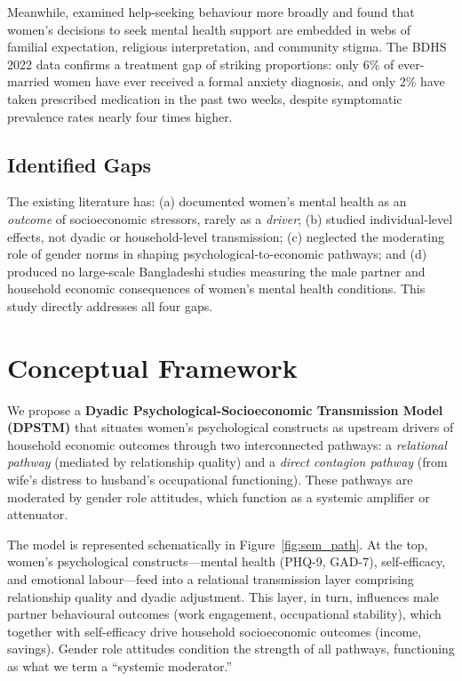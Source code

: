 \documentclass[12pt, a4paper]{article}
\begin{document}
Meanwhile, \citet{rahman2025} examined help-seeking behaviour more broadly and found that women's decisions to seek mental health support are embedded in webs of familial expectation, religious interpretation, and community stigma. The BDHS 2022 data \citep{niport2023} confirms a treatment gap of striking proportions: only 6\% of ever-married women have ever received a formal anxiety diagnosis, and only 2\% have taken prescribed medication in the past two weeks, despite symptomatic prevalence rates nearly four times higher.

\subsection{Identified Gaps}

The existing literature has: (a) documented women's mental health as an \emph{outcome} of socioeconomic stressors, rarely as a \emph{driver}; (b) studied individual-level effects, not dyadic or household-level transmission; (c) neglected the moderating role of gender norms in shaping psychological-to-economic pathways; and (d) produced no large-scale Bangladeshi studies measuring the male partner and household economic consequences of women's mental health conditions. This study directly addresses all four gaps.


\section{Conceptual Framework}\label{sec:framework}

We propose a \textbf{Dyadic Psychological-Socioeconomic Transmission Model (DPSTM)} that situates women's psychological constructs as upstream drivers of household economic outcomes through two interconnected pathways: a \emph{relational pathway} (mediated by relationship quality) and a \emph{direct contagion pathway} (from wife's distress to husband's occupational functioning). These pathways are moderated by gender role attitudes, which function as a systemic amplifier or attenuator.

The model is represented schematically in Figure~\ref{fig:sem_path}. At the top, women's psychological constructs—mental health (PHQ-9, GAD-7), self-efficacy, and emotional labour—feed into a relational transmission layer comprising relationship quality and dyadic adjustment. This layer, in turn, influences male partner behavioural outcomes (work engagement, occupational stability), which together with self-efficacy drive household socioeconomic outcomes (income, savings). Gender role attitudes condition the strength of all pathways, functioning as what we term a ``systemic moderator.''
\end{document}
